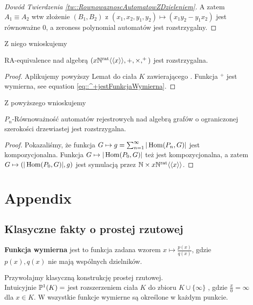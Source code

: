 \begin{df}
\begin{proof}[Dowód Twierdzenia \ref{tw::RownowaznoscAutomatowZDzieleniem}]
	A zatem $A_1 \equiv A_2$ wtw złożenie $(B_1, B_2)$ z  $(x_1, x_2, y_1, y_2) \mapsto (x_1y_2 - y_1x_2)$ jest równoważne 0, a zeroness polynomial automatów jest rozstrzygalny.
\end{proof}
Z niego wnioskujemy
\begin{tw}
	RA-equivalence nad algebrą $(x \mathbb{ N }^{\text{rat}} \langle\langle x \rangle\rangle , +, \times, ^+)$ jest rozstrzygalna.
\end{tw}
\begin{proof}
	Aplikujemy powyższy Lemat do ciała $K$ zawierającego \Nratqr. Funkcja $^+$ jest wymierna, see equation \eqref{eq::^+jestFunkcjaWymierna}.
\end{proof}
Z powyższego wnioskujemy
\begin{tw}
	$P_n$-Równoważność automatów rejestrowych nad algebrą grafów o ograniczonej szerokości drzewiastej jest rozstrzygalna.
\end{tw}
\begin{proof}
	Pokazaliśmy, że funkcja $G \mapsto g = \sum_{n=1}^{\infty} | \operatorname{Hom}(P_n, G) |$ jest kompozycjonalna. Funkcja $G \mapsto | \operatorname{Hom}(P_0, G) |$ też jest kompozycjonalna, a zatem $G \mapsto (| \operatorname{Hom}(P_0, G) |, g)$ jest symulacją przez $\mathbb{N} \times x \mathbb{ N }^{\text{rat}} \langle\langle x \rangle\rangle $.
\end{proof}
\section{Appendix}

\subsection{Klasyczne fakty o prostej rzutowej}
\begin{df}
	\textbf{Funkcja wymierna} jest to funkcja zadana wzorem $x \mapsto \frac{p(x)}{q(x)}$, gdzie $p(x), q(x)$ nie mają wspólnych dzielników.
\end{df}
Przywołajmy klasyczną konstrukcję prostej rzutowej.
\\
Intuicyjnie $\mathbb{P}^{1}(K) =$ jest rozszerzeniem ciała $K$ do zbioru $K \cup \{ \infty \}$ , gdzie $\frac{x}{0} = \infty$ dla $x \in K$. W  wszystkie funkcje wymierne są określone w każdym punkcie.


\end{df}

